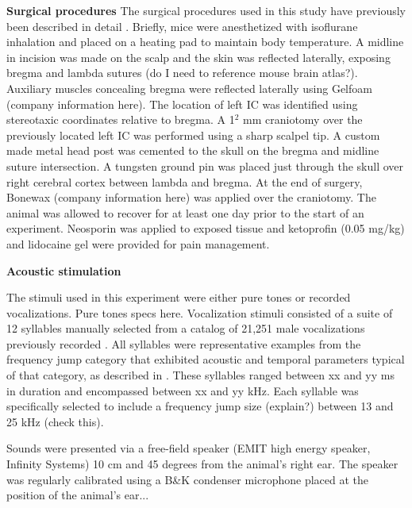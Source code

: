\documentclass[12pt]{article}
\begin{document}
\vspace{3mm}
\textbf{Surgical procedures}
The surgical procedures used in this study have previously been described in detail \cite{muniakpreparation2012}. Briefly, mice were anesthetized with isoflurane inhalation and placed on a heating pad to maintain body temperature. A midline in incision was made on the scalp and the skin was reflected laterally, exposing bregma and lambda sutures (do I need to reference mouse brain atlas?). Auxiliary muscles concealing bregma were reflected laterally using Gelfoam (company information here). The location of left IC was identified using stereotaxic coordinates relative to bregma. A 1$^{2}$ mm craniotomy over the previously located left IC was performed using a sharp scalpel tip. A custom made metal head post was cemented to the skull on the bregma and midline suture intersection. A tungsten ground pin was placed just through the skull over right cerebral cortex between lambda and bregma. At the end of surgery, Bonewax (company information here) was applied over the craniotomy. The animal was allowed to recover for at least one day prior to the start of an experiment. Neosporin was applied to exposed tissue and ketoprofin (0.05 mg/kg) and lidocaine gel were provided for pain management. 


\vspace{3mm}
\textbf{Acoustic stimulation}

The stimuli used in this experiment were either pure tones or recorded vocalizations. Pure tones specs here. 
Vocalization stimuli consisted of a suite of 12 syllables manually selected from a catalog of 21,251 male vocalizations previously recorded \cite{mahrtengineered2013}. All syllables were representative examples from the frequency jump category that exhibited acoustic and temporal parameters typical of that category, as described in \cite{mahrtengineered2013}.  These syllables ranged between xx and yy ms in duration and encompassed between xx and yy kHz. Each syllable was specifically selected to include a frequency jump size (explain?) between 13 and 25 kHz (check this).


Sounds were presented via a free-field speaker (EMIT high energy speaker, Infinity Systems) 10 cm and 45 degrees from the animal's right ear. The speaker was regularly calibrated using a B&K condenser microphone placed at the position of the animal's ear... 
\end{document}
